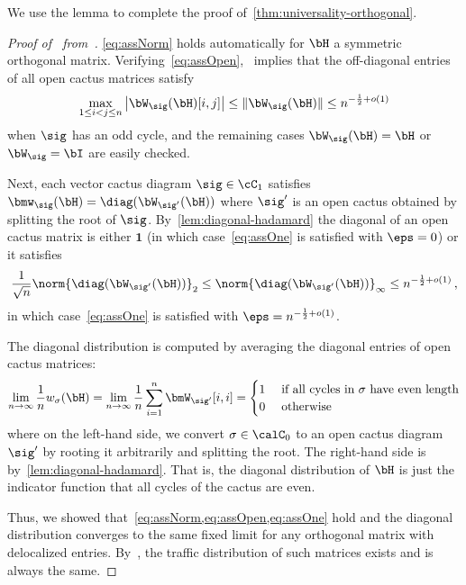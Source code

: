 We use the lemma to complete the proof of~\cref{thm:universality-orthogonal}.
\begin{proof}[Proof of~ from~]
    \cref{eq:assNorm} holds automatically for $\bH$ a symmetric orthogonal matrix.
    Verifying~\cref{eq:assOpen},~ implies that the off-diagonal entries of all open cactus matrices satisfy
    \[
        \max_{1\le i<j\le n} \left|\bW_\sig(\bH)[i,j]\right|\le \|\bW_\sig(\bH)\|\le n^{-\frac 12+o(1)}
    \]
    when $\sig$ has an odd cycle, and the remaining cases $\bW_\sig(\bH) = \bH$ or $\bW_\sig = \bI$ are easily checked.

    Next, each vector cactus diagram $\sig \in \cC_1$ satisfies $\bmw_\sig(\bH) = \diag(\bW_{\sig'}(\bH))$ where $\sig'$ is an open cactus obtained by splitting the root of $\sig$.
    By~\cref{lem:diagonal-hadamard} the diagonal of an open cactus matrix is either $\bm 1$ (in which case~\cref{eq:assOne} is satisfied with $\eps = 0$) or it satisfies
    \[
        \frac{1}{\sqrt{n}} \norm{\diag(\bW_{\sig'}(\bH))}_2 \le \norm{\diag(\bW_{\sig'}(\bH))}_\infty \leq n^{-\frac 12 + o(1)}\,,
    \]
    in which case~\cref{eq:assOne} is satisfied with $\eps = n^{-\frac 12 +o(1)}$.
    
    The diagonal distribution is computed by averaging the diagonal entries of open cactus matrices:
    \[
        \lim_{n\to\infty} \frac 1n w_\sigma(\bH) = \lim_{n\to\infty} \frac 1n \sum_{i=1}^n \bmW_{\sig'}[i,i] = \begin{cases}
            1 & \text{ if all cycles in $\sigma$ have even length}\\
            0 & \text{ otherwise}
        \end{cases}
    \]
    where on the left-hand side, we convert $\sigma\in\calC_0$ to an open cactus
    diagram $\sig'$ by rooting it arbitrarily and splitting the root.
    The right-hand side is by~\cref{lem:diagonal-hadamard}.
    That is, the diagonal distribution of $\bH$ is just the indicator function that all cycles of the cactus are even.

    Thus, we showed that~\cref{eq:assNorm,eq:assOpen,eq:assOne} hold and the diagonal distribution converges
    to the same fixed limit for any orthogonal matrix with delocalized entries. By~, the
    traffic distribution of such matrices exists
    and is always the same.
    

\end{proof}
